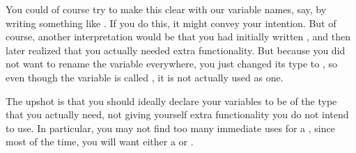 You could of course try to make this clear with
our variable names, say, by writing something like
.
If you do this, it might convey your intention.
But of course, another interpretation would be that you had initially
written , and then later realized that you actually
needed extra functionality. But because you did not want to rename the
variable everywhere, you just changed its type to ,
so even though the variable is called , it is not actually
used as one.

The upshot is that you should ideally declare your variables to be
of the type that you actually need, not giving yourself extra
functionality you do not intend to use. 
In particular, you may not find too many immediate uses for a
,
since most of the time, you will want either a  or .
